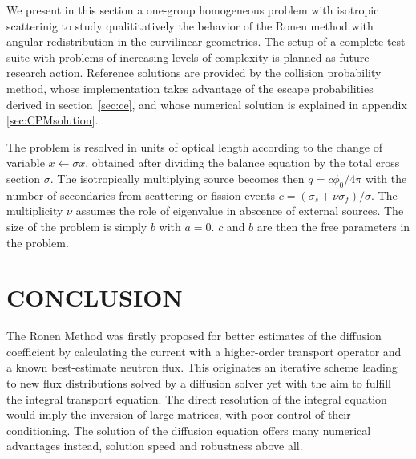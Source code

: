 \documentclass{ictt26}
\begin{document}
We present in this section a one-group homogeneous problem with isotropic scatterinig to study qualititatively the behavior of the Ronen method with angular redistribution in the curvilinear geometries. The setup of a complete test suite with problems of increasing levels of complexity is planned as future research action. Reference solutions are provided by the collision probability method, whose implementation takes advantage of the escape probabilities derived in section~\ref{sec:ce}, and whose numerical solution is explained in appendix \ref{sec:CPMsolution}.

The problem is resolved in units of optical length according to the change of variable $x \leftarrow \sigma x$, obtained after dividing the balance equation by the total cross section $\sigma$. The isotropically multiplying source becomes then $q = c \phi_0 / 4\pi$ with the number of secondaries from scattering or fission events $c = (\sigma_s + \nu \sigma_f)/\sigma$. The multiplicity $\nu$ assumes the role of eigenvalue in abscence of external sources. The size of the problem is simply $b$ with $a=0$. $c$ and $b$ are then the free parameters in the problem.



\section{CONCLUSION}
\label{sec:cncls}

The Ronen Method was firstly proposed for better estimates of the diffusion coefficient by calculating the current with a higher-order transport operator and a known best-estimate neutron flux. This originates an iterative scheme leading to new flux distributions solved by a diffusion solver yet with the aim to fulfill the integral transport equation. The direct resolution of the integral equation would imply the inversion of large matrices, with poor control of their conditioning. The solution of the diffusion equation offers many numerical advantages instead, solution speed and robustness above all.
\end{document}
